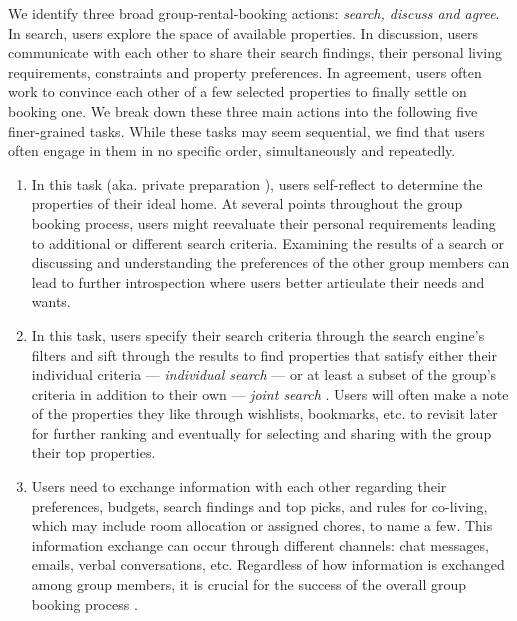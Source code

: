 We identify three broad group-rental-booking actions: \textit{search, discuss and agree}. In search, users explore the space of available properties. In discussion, users communicate with each other to share their search findings, their personal living requirements, constraints and property preferences. In agreement, users often work to convince each other of a few selected properties to finally settle on booking one. 
We break down these three main actions into the following five finer-grained tasks. While these tasks may seem sequential, we find that users often engage in them in no specific order, simultaneously and repeatedly.

\begin{enumerate}[label={}, leftmargin=0cm, itemindent=0.2cm]

\item \tIntrospection In this task (aka. private preparation \cite{pocketnegotiator}), users self-reflect to determine the properties of their ideal home. At several points throughout the group booking process, users might reevaluate their personal requirements leading to additional or different search criteria. Examining  the results of a search or discussing and understanding the preferences of the other group members can lead to further introspection where users better articulate their needs and wants. 

\item \tSearch  In this task, users specify their search criteria through the search engine's filters and sift through the results to find properties that satisfy either their individual criteria --- \textit{individual search} --- or at least a subset of the group's criteria in addition to their own --- \textit{joint search} \cite{resultsspace}. Users will often make a note of the properties they like through wishlists, bookmarks, etc. to revisit later for further ranking and eventually for selecting and sharing with the group their top properties.

\item \tInformationExchange  Users need to exchange information with each other regarding their preferences, budgets, search findings and top picks, and rules for co-living, which may include room allocation or assigned chores, to name a few. This information exchange can occur through different channels: chat messages, emails, verbal conversations, etc. Regardless of how information is exchanged among group members, it is crucial for the success of the overall group booking process \cite{meetingmediator}.
 

\end{enumerate}
